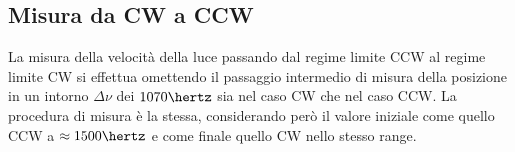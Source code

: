 \subsection{Misura da CW a CCW}
La misura della velocità della luce passando dal regime limite CCW al regime limite CW si effettua omettendo il passaggio intermedio di misura della posizione in un intorno $\Delta\nu$ dei $1070\hertz$ sia nel caso CW che nel caso CCW.
La procedura di misura è la stessa, considerando però il  valore iniziale come quello CCW a $\approx1500\hertz$  e come finale quello CW nello stesso range.
